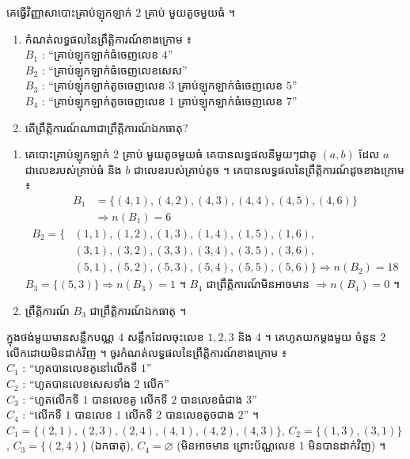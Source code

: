 \begin{example}[លំហាត់គំរូ]
គេធ្វើវិញ្ញាសាបោះគ្រាប់ឡុកឡាក់ $2$ គ្រាប់ មួយតូចមួយធំ ។
\begin{enumerate}[a]
  \item កំណត់លទ្ធផលនៃព្រឹត្តិការណ៍ខាងក្រោម ៖\\
  $B_1$ : “គ្រាប់ឡុកឡាក់ធំចេញលេខ $4$”\\
  $B_2$ : “គ្រាប់ឡុកឡាក់ធំចេញលេខសេស”\\
  $B_3$ : “គ្រាប់ឡុកឡាក់តូចចេញលេខ $3$ គ្រាប់ឡុកឡាក់ធំចេញលេខ $5$”\\
  $B_4$ : “គ្រាប់ឡុកឡាក់តូចចេញលេខ $1$ គ្រាប់ឡុកឡាក់ធំចេញលេខ $7$”
  \item តើព្រឹត្តិការណ៍ណាជាព្រឹត្តិការណ៍ឯកធាតុ?
\end{enumerate}
\ans
\begin{enumerate}[a]
  \item គេបោះគ្រាប់ឡុកឡាក់ $2$ គ្រាប់ មួយតូចមួយធំ គេបានលទ្ធផលនីមួយៗជាគូ $(a, b)$ ដែល $a$ ជាលេខរបស់គ្រាប់ធំ និង $b$ ជាលេខរបស់គ្រាប់តូច ។ គេបានលទ្ធផលនៃព្រឹត្តិការណ៍ដូចខាងក្រោម ៖
  \[
\begin{aligned}
B_1 &= \{(4, 1), (4, 2), (4, 3), (4, 4), (4, 5), (4, 6)\}\\
&\Rightarrow n(B_1) = 6
\end{aligned}
\]
  \[
  \begin{aligned}
  B_2 = \{&(1, 1), (1, 2), (1, 3), (1, 4), (1, 5), (1, 6),\\
  &(3, 1), (3, 2), (3, 3), (3, 4), (3, 5), (3, 6),\\
  &(5, 1), (5, 2), (5, 3), (5, 4), (5, 5), (5, 6)\} \Rightarrow n(B_2) = 18
  \end{aligned}
  \]
  $B_3 = \{(5, 3)\} \Rightarrow n(B_3) = 1$ ។ $B_4$ ជាព្រឹត្តិការណ៍មិនអាចមាន $\Rightarrow n(B_4) = 0$ ។
  \item ព្រឹត្តិការណ៍ $B_3$ ជាព្រឹត្តិការណ៍ឯកធាតុ ។
\end{enumerate}
\end{example}

\begin{pro}
ក្នុងថង់មួយមានសន្លឹកបណ្ណ $4$ សន្លឹកដែលចុះលេខ $1, 2, 3$ និង $4$ ។ គេហូតយកម្ដងមួយ ចំនួន $2$ លើកដោយមិនដាក់វិញ ។ ចូរកំណត់លទ្ធផលនៃព្រឹត្តិការណ៍ខាងក្រោម ៖\\
$C_1$ : “ហូតបានលេខគូនៅលើកទី $1$”\\
$C_2$ : “ហូតបានលេខសេសទាំង $2$ លើក”\\
$C_3$ : “ហូតលើកទី $1$ បានលេខគូ លើកទី $2$ បានលេខធំជាង $3$”\\
$C_4$ : “លើកទី $1$ បានលេខ $1$ លើកទី $2$ បានលេខតូចជាង $2$” ។
\ans
$C_1 = \{(2, 1), (2, 3), (2, 4), (4, 1), (4, 2), (4, 3)\}$, \quad $C_2 = \{(1, 3), (3, 1)\}$, \quad $C_3 = \{(2, 4)\}$ (ឯកធាតុ), \quad $C_4 = \varnothing$ (មិនអាចមាន ព្រោះប័ណ្ណលេខ $1$ មិនបានដាក់វិញ) ។
\end{pro}

